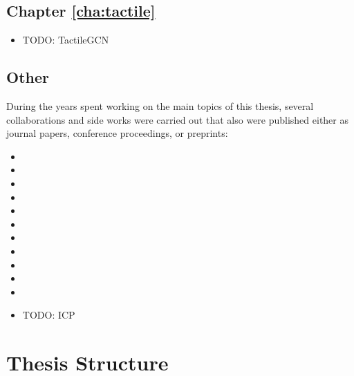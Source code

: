 \subsection{Chapter \ref{cha:tactile}}

\begin{itemize}
  \item TODO: TactileGCN
\end{itemize}

\subsection{Other}

During the years spent working on the main topics of this thesis, several collaborations and side works were carried out that also were published either as journal papers, conference proceedings, or preprints:

\begin{itemize}
  \item {}
  \item {}
  \item {}
  \item {}
  \item {}
  \item {}
  \item {}
  \item {}
  \item {}
  \item {}
  \item {}
  \item TODO: ICP
\end{itemize}

\section{Thesis Structure}
\label{cha:introduction:sec:structure}
